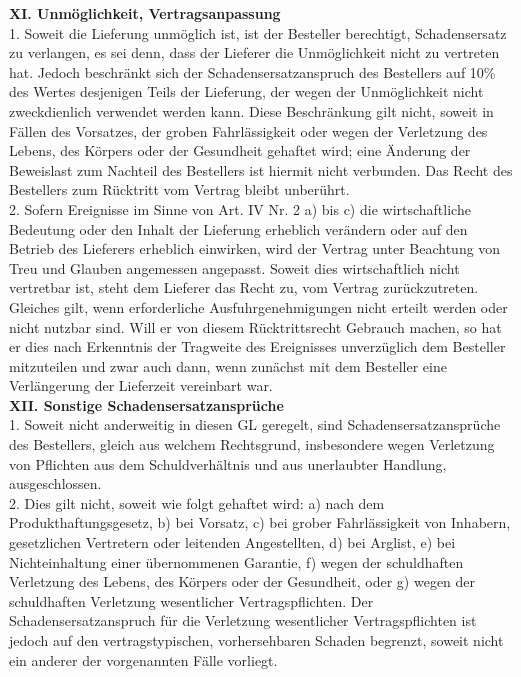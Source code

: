 \begin{multicols}{2}
\begin{scriptsize}
	\textbf{XI. Unmöglichkeit, Vertragsanpassung}\\
	1. Soweit die Lieferung unmöglich ist, ist der Besteller berechtigt, Schadensersatz zu verlangen, es sei denn, dass der Lieferer die Unmöglichkeit nicht zu vertreten hat. Jedoch beschränkt sich der Schadensersatzanspruch des Bestellers auf 10\% des Wertes desjenigen Teils der Lieferung, der wegen der Unmöglichkeit nicht zweckdienlich verwendet werden kann. Diese Beschränkung gilt nicht, soweit in Fällen des Vorsatzes, der groben Fahrlässigkeit oder wegen der Verletzung des Lebens, des Körpers oder der Gesundheit gehaftet wird; eine Änderung der Beweislast zum Nachteil des Bestellers ist hiermit nicht verbunden. Das Recht des Bestellers zum Rücktritt vom Vertrag bleibt unberührt.\\
	2. Sofern Ereignisse im Sinne von Art. IV Nr. 2 a) bis c) die wirtschaftliche Bedeutung oder den Inhalt der Lieferung erheblich verändern oder auf den Betrieb des Lieferers erheblich einwirken, wird der Vertrag unter Beachtung von Treu und Glauben angemessen angepasst. Soweit dies wirtschaftlich nicht vertretbar ist, steht dem Lieferer das Recht zu, vom Vertrag zurückzutreten. Gleiches gilt, wenn erforderliche Ausfuhrgenehmigungen nicht erteilt werden oder nicht nutzbar sind. Will er von diesem Rücktrittsrecht Gebrauch machen, so hat er dies nach Erkenntnis der Tragweite des Ereignisses unverzüglich dem Besteller mitzuteilen und zwar auch dann, wenn zunächst mit dem Besteller eine Verlängerung der Lieferzeit vereinbart war.\\
	\textbf{XII. Sonstige Schadensersatzansprüche}\\
	1. Soweit nicht anderweitig in diesen GL geregelt, sind Schadensersatzansprüche des Bestellers, gleich aus welchem Rechtsgrund, insbesondere wegen Verletzung von Pflichten aus dem Schuldverhältnis und aus unerlaubter Handlung, ausgeschlossen.\\
	2. Dies gilt nicht, soweit wie folgt gehaftet wird: a) nach dem Produkthaftungsgesetz, b) bei Vorsatz, c) bei grober Fahrlässigkeit von Inhabern, gesetzlichen Vertretern oder leitenden Angestellten, d) bei Arglist, e) bei Nichteinhaltung einer übernommenen Garantie, f) wegen der schuldhaften Verletzung des Lebens, des Körpers oder der Gesundheit, oder g) wegen der schuldhaften Verletzung wesentlicher Vertragspflichten. Der Schadensersatzanspruch für die Verletzung wesentlicher Vertragspflichten ist jedoch auf den vertragstypischen, vorhersehbaren Schaden begrenzt, soweit nicht ein anderer der vorgenannten Fälle vorliegt.\\

\end{scriptsize}
\end{multicols}
